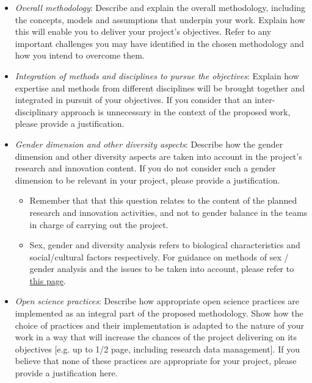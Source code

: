 \documentclass[11pt,draftproposal]{msca-pf}
\begin{document}
\begin{itemize}
    \item \emph{Overall methodology}: Describe and explain the overall methodology,
    including the concepts, models and assumptions that underpin your work.
    Explain how this will enable you to deliver your project’s objectives. Refer
    to any important challenges you may have identified in the chosen methodology
    and how you intend to overcome them.

    \item \emph{Integration of methods and disciplines to pursue the objectives}:
    Explain how expertise and methods from different disciplines will be brought
    together and integrated in pursuit of your objectives. If you consider that
    an inter-disciplinary\footnotemark{} approach is unnecessary in the
    context of the proposed work, please provide a justification.


    \item \emph{Gender dimension and other diversity aspects}: Describe how the
    gender dimension and other diversity aspects are taken into account in the
    project's research and innovation content. If you do not consider such a
    gender dimension to be relevant in your project, please provide a
    justification.
    \begin{itemize}
        \item Remember that that this question relates to the content of the
        planned research and innovation activities, and not to gender balance
        in the teams in charge of carrying out the project.

        \item  Sex, gender and diversity analysis refers to biological
        characteristics and social/cultural factors respectively. For guidance on
        methods of sex / gender analysis and the issues to be taken into account,
        please refer to
        \href{https://ec.europa.eu/info/news/gendered-innovations-2-2020-nov-24_en}{this page}.
    \end{itemize}

    \item \emph{Open science practices}: Describe how appropriate open science
    practices are implemented as an integral part of the proposed methodology.
    Show how the choice of practices and their implementation is adapted to the
    nature of your work in a way that will increase the chances of the project
    delivering on its objectives [e.g. up to 1/2 page, including research data
    management]. If you believe that none of these practices are appropriate for
    your project, please provide a justification here.


\end{itemize}
\end{document}
